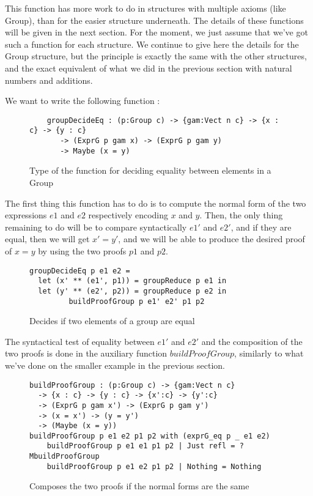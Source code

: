 This function has more work to do in structures with multiple axioms (like Group), than for the easier structure underneath.
The details of these functions will be given in the next section. For the moment, we just assume that we've got such a function for each structure. We continue to give here the details for the Group structure, but the principle is exactly the same with the other structures, and the exact equivalent of what we did in the previous section with natural numbers and additions.

We want to write the following function :

\begin{figure}[H]
\figrule
\begin{center}
\begin{verbatim}
	groupDecideEq : (p:Group c) -> {gam:Vect n c} -> {x : c} -> {y : c} 
	   -> (ExprG p gam x) -> (ExprG p gam y) 
	   -> Maybe (x = y)
\end{verbatim}
\end{center}
\caption{Type of the function for deciding equality between elements in a Group}
\figrule
\end{figure}

The first thing this function has to do is to compute the normal form of the two expressions $e1$ and $e2$ respectively encoding $x$ and $y$.
Then, the only thing remaining to do will be to compare syntactically $e1'$ and $e2'$, and if they are equal, then we will get $x'=y'$, and we will be able to produce the desired proof of $x=y$ by using the two proofs $p1$ and $p2$. 

\begin{figure}[H]
\figrule
\begin{center}
\begin{verbatim}
groupDecideEq p e1 e2 =
  let (x' ** (e1', p1)) = groupReduce p e1 in
  let (y' ** (e2', p2)) = groupReduce p e2 in
	     buildProofGroup p e1' e2' p1 p2
\end{verbatim}
\end{center}
\caption{Decides if two elements of a group are equal}
\figrule
\end{figure}

The syntactical test of equality between $e1'$ and $e2'$ and the composition of the two proofs is done in the auxiliary function $buildProofGroup$, similarly to what we've done on the smaller example in the previous section. 

\begin{figure}[H]
\figrule
\begin{center}
\begin{verbatim}
buildProofGroup : (p:Group c) -> {gam:Vect n c} 
  -> {x : c} -> {y : c} -> {x':c} -> {y':c} 
  -> (ExprG p gam x') -> (ExprG p gam y') 
  -> (x = x') -> (y = y') 
  -> (Maybe (x = y))
buildProofGroup p e1 e2 p1 p2 with (exprG_eq p _ e1 e2)
    buildProofGroup p e1 e1 p1 p2 | Just refl = ?MbuildProofGroup
    buildProofGroup p e1 e2 p1 p2 | Nothing = Nothing
\end{verbatim}
\end{center}
\caption{Composes the two proofs if the normal forms are the same}
\figrule
\end{figure}

